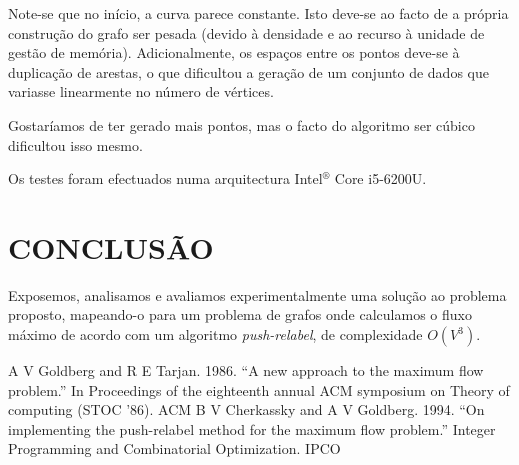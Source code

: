 \documentclass[a4paper, 12pt, conference, portuguese]{ieeeconf}
\begin{document}
Note-se que no início, a curva parece constante. Isto deve-se ao
facto de a própria construção do grafo ser pesada (devido à
densidade e ao recurso à unidade de gestão de memória).
Adicionalmente, os espaços entre os pontos deve-se à duplicação
de arestas, o que dificultou a geração de um conjunto de dados
que variasse linearmente no número de vértices.

Gostaríamos de ter gerado mais pontos, mas o facto do
algoritmo ser cúbico dificultou isso mesmo.

Os testes foram efectuados numa arquitectura Intel$^\circledR$ Core\texttrademark
i5-6200U.


\section{CONCLUSÃO}\label{conclusion}

Exposemos, analisamos e avaliamos experimentalmente uma solução
ao problema proposto, mapeando-o para um problema de grafos onde
calculamos o fluxo máximo de acordo com um algoritmo
\textit{push-relabel}, de complexidade $O(V^3)$.


\begin{thebibliography}{99}
    A V Goldberg and R E Tarjan. 1986.
    ``A new approach to the maximum flow problem.''
    In Proceedings of the eighteenth annual ACM symposium on Theory of computing (STOC '86). ACM
   B V Cherkassky and A V Goldberg. 1994.
    ``On implementing the push-relabel method for the maximum
    flow problem.'' Integer Programming and Combinatorial
    Optimization. IPCO
\end{thebibliography}
\end{document}
